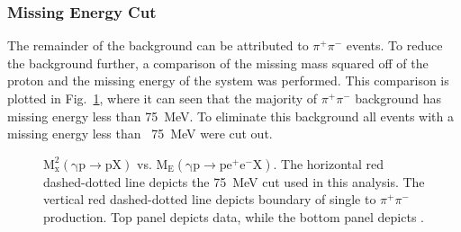 \subsubsection{Missing Energy  Cut}
The remainder of the background can be attributed to $\pi^+\pi^-$ events. To reduce the background further, a comparison of the missing mass squared off of the proton and the missing energy of the system was performed. This comparison is plotted in Fig.~\ref{kinefit.mm2p.mE.data.MC}, where it can seen that the majority of $\pi^+\pi^-$ background has missing energy less than 75~MeV. To eliminate this background all events with a missing energy less than ~75~MeV were cut out.
\begin{figure}[h!]\begin{center}

\caption[$\mathrm{M_x^2(\gamma p \to p X)}$ vs. $\mathrm{M_E(\gamma p \to pe^+e^- X)}$]{\label{kinefit.mm2p.mE.data.MC}$\mathrm{M_x^2(\gamma p \to p X)}$ vs. $\mathrm{M_E(\gamma p \to pe^+e^- X)}$. The horizontal red dashed-dotted line depicts the 75~MeV cut used in this analysis. The vertical red dashed-dotted line depicts boundary of single \piz to $\pi^+\pi^-$  production. Top panel depicts data, while the bottom panel depicts .}

\end{center}\end{figure}

